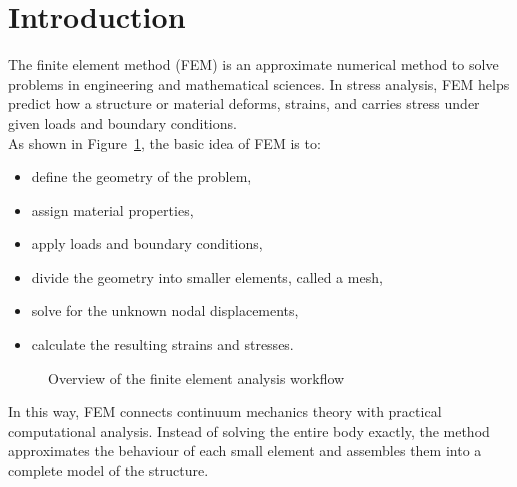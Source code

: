 \documentclass[12pt, a4paper]{article}
\numberwithin{equation}{section}
\begin{document}
\newpage
\section{Introduction}

The finite element method (FEM) is an approximate numerical method to solve problems in engineering and mathematical sciences. In stress analysis, FEM helps predict how a structure or material deforms, strains, and carries stress under given loads and boundary conditions. \\

As shown in Figure~\ref{fig:FEA_logics}, the basic idea of FEM is to:
\begin{itemize}
    \item define the geometry of the problem,
    \item assign material properties,
    \item apply loads and boundary conditions,
    \item divide the geometry into smaller elements, called a mesh,
    \item solve for the unknown nodal displacements,
    \item calculate the resulting strains and stresses.
\end{itemize}

\begin{figure}[ht!]
\centering
{}
\caption{Overview of the finite element analysis workflow}
\label{fig:FEA_logics}
\end{figure}

In this way, FEM connects continuum mechanics theory with practical computational analysis. Instead of solving the entire body exactly, the method approximates the behaviour of each small element and assembles them into a complete model of the structure. 
\end{document}
